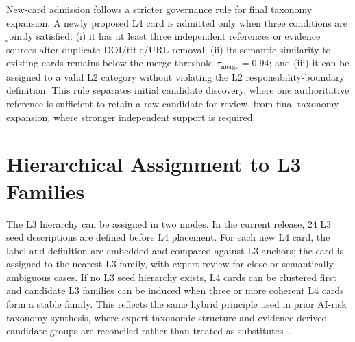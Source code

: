 \documentclass[11pt]{article}
\begin{document}
New-card admission follows a stricter governance rule for final taxonomy expansion. A newly proposed L4 card is admitted only when three conditions are jointly satisfied: (i) it has at least three independent references or evidence sources after duplicate DOI/title/URL removal; (ii) its semantic similarity to existing cards remains below the merge threshold \(\tau_{\mathrm{merge}}=0.94\); and (iii) it can be assigned to a valid L2 category without violating the L2 responsibility-boundary definition. This rule separates initial candidate discovery, where one authoritative reference is sufficient to retain a raw candidate for review, from final taxonomy expansion, where stronger independent support is required.

\section{Hierarchical Assignment to L3 Families}

The L3 hierarchy can be assigned in two modes. In the current release, 24 L3 seed descriptions are defined before L4 placement. For each new L4 card, the label and definition are embedded and compared against L3 anchors; the card is assigned to the nearest L3 family, with expert review for close or semantically ambiguous cases. If no L3 seed hierarchy exists, L4 cards can be clustered first and candidate L3 families can be induced when three or more coherent L4 cards form a stable family. This reflects the same hybrid principle used in prior AI-risk taxonomy synthesis, where expert taxonomic structure and evidence-derived candidate groups are reconciled rather than treated as substitutes~\cite{slattery2024,weidinger2021}.
\end{document}
